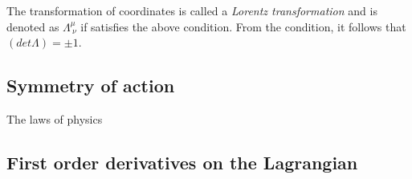 \documentclass{myclass}
\begin{document}
The transformation of coordinates is called a \textit{Lorentz transformation} and is denoted as \( \Lambda^{\mu}_ {\ \nu}\) if satisfies the above condition.
From the condition, it follows that \( (det\Lambda) = \pm 1\).

\section{Symmetry of action}

The laws of physics








\begin{appendices}
\chapter{First order derivatives on the Lagrangian}\label{App:derivlagran}
\end{appendices}
\end{document}
